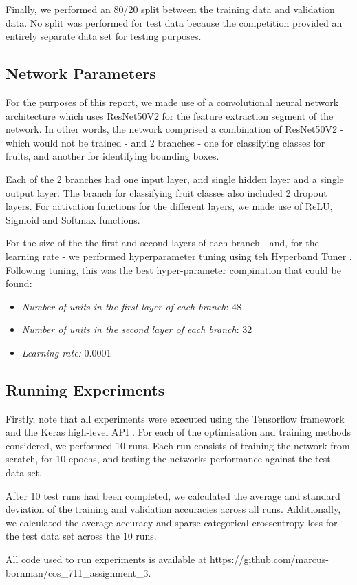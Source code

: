 Finally, we performed an 80/20 split between the training data and validation data. No split was performed for test data because the competition provided an entirely separate data set for testing purposes.

\subsection{Network Parameters}

For the purposes of this report, we made use of a convolutional neural network architecture which uses ResNet50V2 \cite{ResNet50V2} for the feature extraction segment of the network. In other words, the network comprised a combination of ResNet50V2 \cite{ResNet50V2} - which would not be trained - and 2 branches - one for classifying classes for fruits, and another for identifying bounding boxes.

Each of the 2 branches had one input layer, and single hidden layer and a single output layer. The branch for classifying fruit classes also included 2 dropout layers. For activation functions for the different layers, we made use of ReLU, Sigmoid and Softmax functions. 

For the size of the the first and second layers of each branch - and, for the learning rate - we performed hyperparameter tuning using teh Hyperband Tuner \cite{hyperband}. Following tuning, this was the best hyper-parameter compination that could be found:
\begin{itemize}
    \item \emph{Number of units in the first layer of each branch}: 48
    \item \emph{Number of units in the second layer of each branch}: 32
    \item \emph{Learning rate:} 0.0001
\end{itemize}

\subsection{Running Experiments} \label{sec:experiment_run}
Firstly, note that all experiments were executed using  the Tensorflow framework and the Keras high-level API \cite{keras}. For each of the optimisation and training methods considered, we performed 10 runs. Each run consists of training the network from scratch, for 10 epochs, and testing the networks performance against the test data set.

After 10 test runs had been completed, we calculated the average and standard deviation of the training and validation accuracies across all runs. Additionally, we calculated the average accuracy and sparse categorical crossentropy loss for the test data set across the 10 runs.

All code used to run experiments is available at https://github.com/marcus-bornman/cos\_711\_assignment\_3.